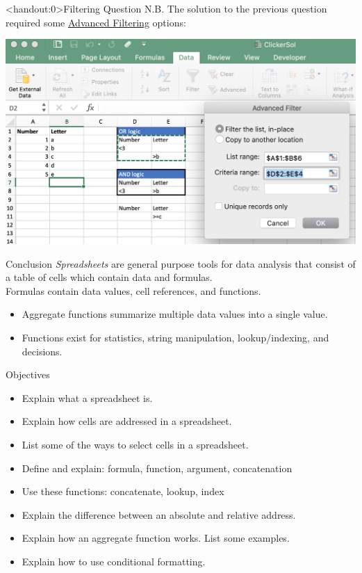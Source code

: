 \documentclass[xcolor=svgnames]{beamer}
\begin{document}
\begin{frame}<handout:0>{Filtering Question}
N.B. The solution to the previous question required some \href{https://www.ablebits.com/office-addins-blog/2016/09/07/excel-advanced-filter}{Advanced Filtering} options:
 \begin{center}
    \includegraphics[height=.5\textheight]{advancedFilter}
 \end{center}

\end{frame}



\begin{frame}[label=current]{Conclusion}
\emph{Spreadsheets} are general purpose tools for data analysis that consist of a table of cells which contain data and formulas.\\[1em]
Formulas contain data values, cell references, and functions.
\begin{itemize}
\item Aggregate functions summarize multiple data values into a single value.
\item Functions exist for statistics, string manipulation, lookup/indexing, and decisions.
\end{itemize}
\end{frame}

\begin{frame}{Objectives}
\begin{itemize}
\item Explain what a spreadsheet is.
\item Explain how cells are addressed in a spreadsheet.
\item List some of the ways to select cells in a spreadsheet.
\item Define and explain: formula, function, argument, concatenation
\item Use these functions: concatenate, lookup, index
\item Explain the difference between an absolute and relative address.
\item Explain how an aggregate function works.  List some examples.
\item Explain how to use conditional formatting.
\end{itemize}
\end{frame}
\end{document}
